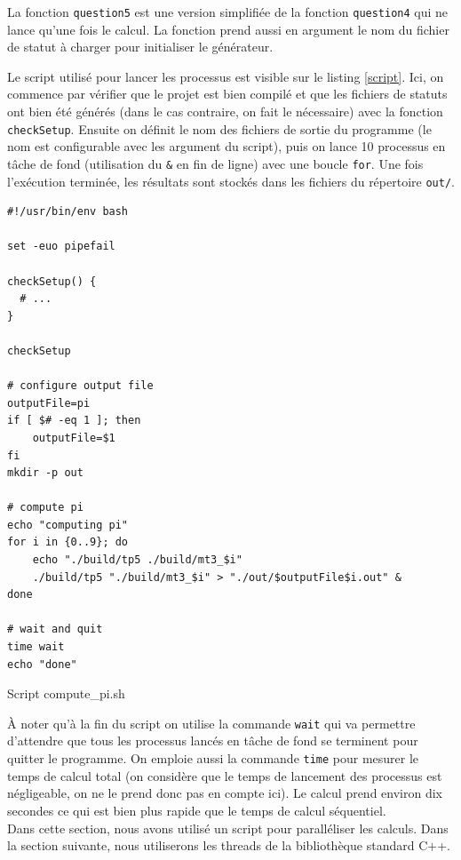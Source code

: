 \documentclass[a4paper]{article}
\begin{document}
La fonction \texttt{question5} est une version simplifiée de la fonction
\texttt{question4} qui ne lance qu'une fois le calcul. La fonction prend
aussi en argument le nom du fichier de statut à charger pour initialiser le
générateur.

Le script utilisé pour lancer les processus est visible sur le listing
\ref{script}. Ici, on commence par vérifier que le projet est bien compilé et
que les fichiers de statuts ont bien été générés (dans le cas contraire, on fait
le nécessaire) avec la fonction \texttt{checkSetup}. Ensuite on définit le
nom des fichiers de sortie du programme (le nom est configurable avec les
argument du script), puis on lance 10 processus en tâche de fond (utilisation du
\texttt{\&} en fin de ligne) avec une boucle \texttt{for}. Une fois
l'exécution terminée, les résultats sont stockés dans les fichiers du répertoire
\texttt{out/}.

\begin{listing}[ht!]
\begin{verbatim}
#!/usr/bin/env bash

set -euo pipefail

checkSetup() {
  # ...
}

checkSetup

# configure output file
outputFile=pi
if [ $# -eq 1 ]; then
    outputFile=$1
fi
mkdir -p out

# compute pi
echo "computing pi"
for i in {0..9}; do
    echo "./build/tp5 ./build/mt3_$i"
    ./build/tp5 "./build/mt3_$i" > "./out/$outputFile$i.out" &
done

# wait and quit
time wait
echo "done"
\end{verbatim}
\caption{Script compute\_pi.sh}
\label{script}
\end{listing}
\clearpage

À noter qu'à la fin du script on utilise la commande \texttt{wait} qui va
permettre d'attendre que tous les processus lancés en tâche de fond se terminent
pour quitter le programme. On emploie aussi la commande \texttt{time} pour
mesurer le temps de calcul total (on considère que le temps de lancement des
processus est négligeable, on ne le prend donc pas en compte ici). Le calcul
prend environ dix secondes ce qui est bien plus rapide que le temps de calcul
séquentiel.\\

Dans cette section, nous avons utilisé un script pour paralléliser les calculs.
Dans la section suivante, nous utiliserons les threads de la bibliothèque
standard C++.
\end{document}
